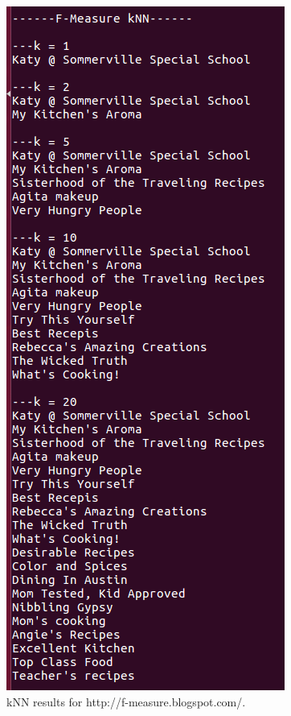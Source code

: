 \documentclass{article}
\begin{document}
\begin{figure}[H]
 \centering
 \includegraphics[width=8 cm]{fmes.png}
  \caption{kNN results for http://f-measure.blogspot.com/.}
\end{figure}
\end{document}

